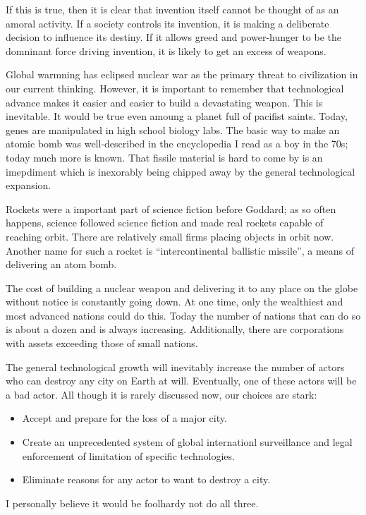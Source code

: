 \documentclass[
	fontsize=10pt, %
	twoside=false, %
	secnumdepth=1, %
]{kaobook}
\begin{document}
If this is true, then it is clear that invention itself
cannot be thought of as an amoral activity.
If a society controls its invention, it is making a deliberate
decision to influence its destiny.
If it allows greed and power-hunger to be the domninant
force driving invention, it is likely to get an excess of
weapons.

Global warmning has eclipsed nuclear war as the primary
threat to civilization in our current thinking.
However, it is important to remember that technological
advance makes it easier and easier to build a devastating weapon.
This is inevitable. It would be true even amoung a planet
full of pacifist saints.
Today, genes are manipulated in high school biology labs.
The basic way to make an atomic bomb was well-described in
the encyclopedia I read as a boy in the 70s; today much
more is known. That fissile material is hard to come by
is an imepdiment which is inexorably being chipped away
by the general technological expansion.

Rockets were a important part of science fiction before Goddard;
as so often happens, science followed science fiction
and made real rockets capable of reaching orbit.
There are relatively small firms
placing objects in orbit now.
Another name for such a
rocket is ``intercontinental ballistic missile'', a means
of delivering an atom bomb.

The cost of building a nuclear weapon and delivering it
to any place on the globe without notice is constantly
going down. At one time, only the wealthiest and most
advanced nations could do this. Today the number of
nations that can do so is about a dozen and is always
increasing. Additionally, there are corporations with
assets exceeding those of small nations.

The general technological growth will inevitably
increase the number of actors who can destroy any city
on Earth at will.
Eventually, one of these actors will be a bad actor.
All though it is rarely discussed now, our choices are
stark:
\begin{itemize}
\item Accept and prepare for the loss of a major city.
\item Create an unprecedented system of global internationl
  surveillance and legal enforcement of limitation of
  specific technologies.
\item Eliminate reasons for any actor to want to destroy
  a city.
\end{itemize}
I personally believe it would be foolhardy not do
all three.
\end{document}
